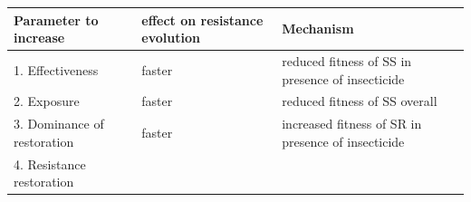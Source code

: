\documentclass[11pt,]{article}
\begin{document}
\begin{longtable}[]{@{}lll@{}}
\toprule
\begin{minipage}[b]{0.28\columnwidth}\raggedright\strut
Parameter to increase\strut
\end{minipage} & \begin{minipage}[b]{0.10\columnwidth}\raggedright\strut
effect on resistance evolution\strut
\end{minipage} & \begin{minipage}[b]{0.53\columnwidth}\raggedright\strut
Mechanism\strut
\end{minipage}\tabularnewline
\midrule
\endhead
\begin{minipage}[t]{0.28\columnwidth}\raggedright\strut
1. Effectiveness\strut
\end{minipage} & \begin{minipage}[t]{0.10\columnwidth}\raggedright\strut
faster\strut
\end{minipage} & \begin{minipage}[t]{0.53\columnwidth}\raggedright\strut
reduced fitness of SS in presence of insecticide\strut
\end{minipage}\tabularnewline
\begin{minipage}[t]{0.28\columnwidth}\raggedright\strut
2. Exposure\strut
\end{minipage} & \begin{minipage}[t]{0.10\columnwidth}\raggedright\strut
faster\strut
\end{minipage} & \begin{minipage}[t]{0.53\columnwidth}\raggedright\strut
reduced fitness of SS overall\strut
\end{minipage}\tabularnewline
\begin{minipage}[t]{0.28\columnwidth}\raggedright\strut
3. Dominance of restoration\strut
\end{minipage} & \begin{minipage}[t]{0.10\columnwidth}\raggedright\strut
faster\strut
\end{minipage} & \begin{minipage}[t]{0.53\columnwidth}\raggedright\strut
increased fitness of SR in presence of insecticide\strut
\end{minipage}\tabularnewline
\begin{minipage}[t]{0.28\columnwidth}\raggedright\strut
4. Resistance restoration\strut
\end{minipage} & \begin{minipage}[t]{0.10\columnwidth}\raggedright\strut

\end{minipage}
\end{longtable}
\end{document}
